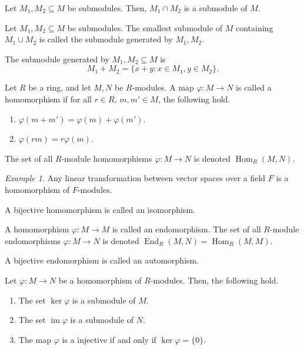 \documentclass[11pt]{article}
\DeclareMathOperator{\im}{im}
\DeclareMathOperator{\Hom}{Hom}
\DeclareMathOperator{\End}{End}
\theoremstyle{definition}
\theoremstyle{remark}
\newtheorem*{example}{Example}
\numberwithin{equation}{section}
\begin{document}
    \begin{lemma}
        Let $M_1, M_2 \subseteq M$ be submodules. Then, $M_1 \cap M_2$ is a submodule
        of $M$.
    \end{lemma}
    \begin{definition}
        Let $M_1, M_2 \subseteq M$ be submodules. The smallest submodule of $M$
        containing $M_1 \cup M_2$ is called the submodule generated by $M_1, M_2$.
    \end{definition}
    \begin{lemma}
        The submodule generated by $M_1, M_2 \subseteq M$ is \[
            M_1 + M_2 = \{x + y : x \in M_1, y \in M_2\}.
        \] 
    \end{lemma}

    \begin{definition}
        Let $R$ be a ring, and let $M, N$ be $R$-modules. A map $\varphi\colon M \to
        N$ is called a homomorphism if for all $r \in R$, $m, m' \in M$, the
        following hold. \begin{enumerate}
            \itemsep0em
            \item $\varphi(m + m') = \varphi(m) + \varphi(m')$.
            \item $\varphi(rm) = r\varphi(m)$.
        \end{enumerate}
        The set of all $R$-module homomorphisms $\varphi\colon M \to N$ is denoted
        $\Hom_R(M, N)$.
    \end{definition}
    \begin{example}
        Any linear transformation between vector spaces over a field $F$ is a
        homomorphism of $F$-modules.
    \end{example}
    \begin{definition}
        A bijective homomorphism is called an isomorphism.
    \end{definition}
    \begin{definition}
        A homomorphism $\varphi\colon M \to M$ is called an endomorphism.
        The set of all $R$-module endomorphisms $\varphi\colon M \to N$ is denoted
        $\End_R(M, N) = \Hom_R(M, M)$.
    \end{definition}
    \begin{definition}
        A bijective endomorphism is called an automorphism.
    \end{definition}

    \begin{lemma}
        Let $\varphi\colon M \to N$ be a homomorphism of $R$-modules. Then, the
        following hold. \begin{enumerate}
            \itemsep0em
            \item The set $\ker\varphi$ is a submodule of $M$.
            \item The set $\im\varphi$ is a submodule of $N$.
            \item The map $\varphi$ is a injective if and only if $\ker\varphi =
            \{0\}$.
        \end{enumerate}
    \end{lemma}
\end{document}
